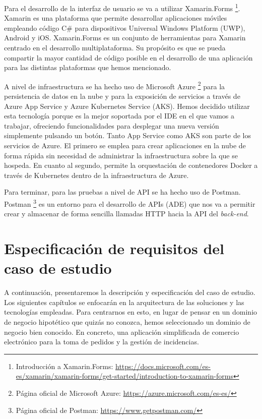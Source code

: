 \documentclass[11pt,spanish,listoffigures]{tfgetsinf}
\begin{document}
Para el desarrollo de la interfaz de usuario se va a utilizar Xamarin.Forms \footnote{ Introducción a Xamarin.Forms: \url{https://docs.microsoft.com/es-es/xamarin/xamarin-forms/get-started/introduction-to-xamarin-forms}}. Xamarin es una plataforma que permite desarrollar aplicaciones móviles empleando código C\# para dispositivos Universal Windows Platform (UWP), Android y iOS. Xamarin.Forms es un conjunto de herramientas para Xamarin centrado en el desarrollo multiplataforma. Su propósito es que se pueda compartir la mayor cantidad de código posible en el desarrollo de una aplicación para las distintas plataformas que hemos mencionado.

A nivel de infraestructura se ha hecho uso de Microsoft Azure \footnote{ Página oficial de Microsoft Azure: \url{https://azure.microsoft.com/es-es/}} para la persistencia de datos en la nube y para la exposición de servicios a través de Azure App Service y Azure Kubernetes Service (AKS). Hemos decidido utilizar esta tecnología porque es la mejor soportada por el IDE en el que vamos a trabajar, ofreciendo funcionalidades para desplegar una nueva versión simplemente pulsando un botón. Tanto App Service como AKS son parte de los servicios de Azure. El primero se emplea para crear aplicaciones en la nube de forma rápida sin necesidad de administrar la infraestructura sobre la que se hospeda. En cuanto al segundo, permite la orquestación de contenedores Docker a través de Kubernetes dentro de la infraestructura de Azure.

Para terminar, para las pruebas a nivel de API se ha hecho uso de Postman. Postman \footnote{ Página oficial de Postman: \url{https://www.getpostman.com/}} es un entorno para el desarrollo de APIs (ADE) que nos va a permitir crear y almacenar de forma sencilla llamadas HTTP hacia la API del \textit{back-end}.


\chapter{Especificación de requisitos del caso de estudio}

A continuación, presentaremos la descripción y especificación del caso de estudio. Los siguientes capítulos se enfocarán en la arquitectura de las soluciones y las tecnologías empleadas. Para centrarnos en esto, en lugar de pensar en un dominio de negocio hipotético que quizás no conozca, hemos seleccionado un dominio de negocio bien conocido. En concreto, una aplicación simplificada de comercio electrónico para la toma de pedidos y la gestión de incidencias.
\end{document}
